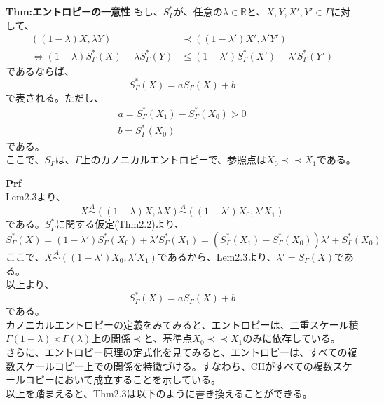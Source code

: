 \documentclass[a4paper,11pt]{jsarticle}
\begin{document}
\begin{itembox}[l]{\textbf{Thm:エントロピーの一意性}}
もし、$S_{\Gamma}^*$が、任意の$\lambda \in \mathbb{R}$と、$X,Y,X',Y' \in \Gamma $に対して、
\begin{align}
    ((1-\lambda)X,\lambda Y) &\prec ((1-\lambda')X',\lambda' Y') \\
    \Leftrightarrow (1-\lambda)S_{\Gamma}^*(X)+\lambda S_{\Gamma}^*(Y) &\leq (1-\lambda')S_{\Gamma}^*(X')+\lambda' S_{\Gamma}^*(Y')
\end{align}
であるならば、
\begin{equation}
    S_{\Gamma}^*(X)=aS_{\Gamma} (X)+b
\end{equation}
で表される。ただし、
\begin{align}
    a = S_{\Gamma}^*(X_1)-S_{\Gamma}^*(X_0)>0\\
    b = S_{\Gamma}^*(X_0)
\end{align}
である。\\
ここで、$S_{\Gamma}$は、$\Gamma$上のカノニカルエントロピーで、参照点は$X_0 \prec \prec X_1$である。
\end{itembox}
\textbf{Prf}\\
Lem2.3より、
\begin{equation}
    X \overset{A}{\sim} ((1-\lambda)X,\lambda X) \overset{A}{\sim} ((1-\lambda')X_0,\lambda' X_1)
\end{equation}
である。$S_{\Gamma}^*$に関する仮定(Thm2.2)より、
\begin{equation}
    S_{\Gamma}^*(X) = (1-\lambda')S_{\Gamma}^*(X_0)+\lambda' S_{\Gamma}^*(X_1)=(S_{\Gamma}^*(X_1)-S_{\Gamma}^*(X_0))\lambda'+S_{\Gamma}^*(X_0)
\end{equation}
ここで、$X \overset{A}{\sim} ((1-\lambda')X_0,\lambda' X_1)$であるから、Lem2.3より、$\lambda ' = S_{\Gamma}(X)$である。\\
以上より、
\begin{equation}
    S_{\Gamma}^*(X) = aS_{\Gamma}(X)+b
\end{equation}
である。\qedsymbol\\

カノニカルエントロピーの定義をみてみると、エントロピーは、二重スケール積$\Gamma(1-\lambda)\times \Gamma(\lambda)$上の関係$\prec$と、基準点$X_0 \prec \prec X_1$のみに依存している。\\
さらに、エントロピー原理の定式化を見てみると、エントロピーは、すべての複数スケールコピー上での関係を特徴づける。すなわち、CHがすべての複数スケールコピーにおいて成立することを示している。\\
以上を踏まえると、Thm2.3は以下のように書き換えることができる。\\
\end{document}
